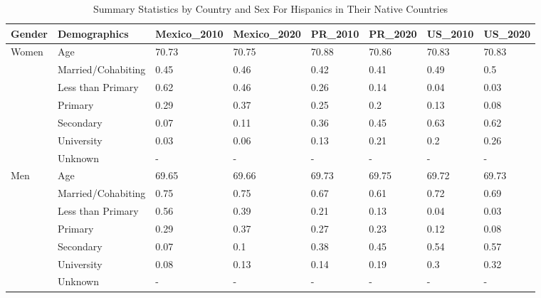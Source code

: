\begin{table}[ht]
\centering
\caption{Summary Statistics by Country and Sex For Hispanics in Their Native Countries} 
\begin{tabular}{l|l|llllll}
  \hline
Gender & Demographics & Mexico\_2010 & Mexico\_2020 & PR\_2010 & PR\_2020 & US\_2010 & US\_2020 \\ 
  \hline
Women & Age & 70.73 & 70.75 & 70.88 & 70.86 & 70.83 & 70.83 \\ 
   & Married/Cohabiting & 0.45 & 0.46 & 0.42 & 0.41 & 0.49 & 0.5 \\ 
   & Less than Primary & 0.62 & 0.46 & 0.26 & 0.14 & 0.04 & 0.03 \\ 
   & Primary & 0.29 & 0.37 & 0.25 & 0.2 & 0.13 & 0.08 \\ 
   & Secondary & 0.07 & 0.11 & 0.36 & 0.45 & 0.63 & 0.62 \\ 
   & University & 0.03 & 0.06 & 0.13 & 0.21 & 0.2 & 0.26 \\ 
   & Unknown & - & - & - & - & - & - \\ 
  Men & Age & 69.65 & 69.66 & 69.73 & 69.75 & 69.72 & 69.73 \\ 
   & Married/Cohabiting & 0.75 & 0.75 & 0.67 & 0.61 & 0.72 & 0.69 \\ 
   & Less than Primary & 0.56 & 0.39 & 0.21 & 0.13 & 0.04 & 0.03 \\ 
   & Primary & 0.29 & 0.37 & 0.27 & 0.23 & 0.12 & 0.08 \\ 
   & Secondary & 0.07 & 0.1 & 0.38 & 0.45 & 0.54 & 0.57 \\ 
   & University & 0.08 & 0.13 & 0.14 & 0.19 & 0.3 & 0.32 \\ 
   & Unknown & - & - & - & - & - & - \\ 
   \hline
\end{tabular}
\end{table}
